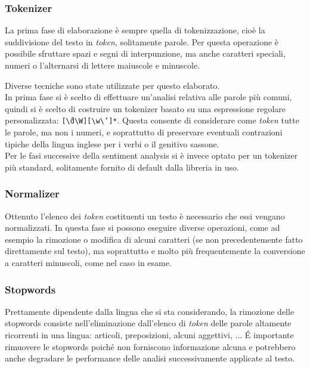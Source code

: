 \documentclass[hidelinks, 12pt]{article}
\begin{document}
\subsubsection{Tokenizer}

La prima fase di elaborazione è sempre quella di tokenizzazione, cioè la suddivisione del testo in \textit{token}, solitamente parole. Per questa operazione è possibile sfruttare spazi e segni di interpunzione, ma anche caratteri speciali, numeri o l'alternarsi di lettere maiuscole e minuscole.

Diverse tecniche sono state utilizzate per questo elaborato. \\
In prima fase si è scelto di effettuare un'analisi relativa alle parole più comuni, quindi si è scelto di costruire un tokenizer basato su una espressione regolare personalizzata: \texttt{[\^\textbackslash d\textbackslash W][\textbackslash w\textbackslash']*}. Questa consente di considerare come \textit{token} tutte le parole, ma non i numeri, e soprattutto di preservare eventuali contrazioni tipiche della lingua inglese per i verbi o il genitivo sassone. \\
Per le fasi successive della sentiment analysis si è invece optato per un tokenizer più standard, solitamente fornito di default dalla libreria in uso.


\subsubsection{Normalizer}

Ottenuto l'elenco dei \textit{token} costituenti un testo è necessario che essi vengano normalizzati. In questa fase si possono eseguire diverse operazioni, come ad esempio la rimozione o modifica di alcuni caratteri (se non precedentemente fatto direttamente sul testo), ma soprattutto e molto più frequentemente la conversione a caratteri minuscoli, come nel caso in esame.


\subsubsection{Stopwords}

Prettamente dipendente dalla lingua che si sta considerando, la rimozione delle stopwords consiste nell'eliminazione dall'elenco di \textit{token} delle parole altamente ricorrenti in una lingua: articoli, preposizioni, alcuni aggettivi, ... É importante rimuovere le stopwords poiché non forniscono informazione alcuna e potrebbero anche degradare le performance delle analisi successivamente applicate al testo.
\end{document}
